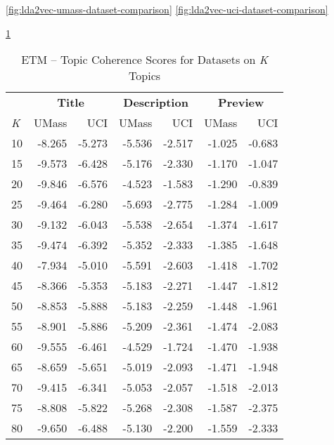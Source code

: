 \documentclass[letterpaper,12pt]{article}
\begin{document}
\ref{fig:lda2vec-umass-dataset-comparison}
\ref{fig:lda2vec-uci-dataset-comparison}

\ref{tab:etm_data_comp}
\begin{table}
	\caption{\label{tab:etm_data_comp} ETM -- Topic Coherence Scores for Datasets on \emph{K} Topics}
	\begin{center}
		\begin{tabular}{| l | rr | rr | rr |}
			\hline
			{} & \multicolumn{2}{c|}{\textbf{Title}} & \multicolumn{2}{c|}{\textbf{Description}} & \multicolumn{2}{c|}{\textbf{Preview}} \\
			\emph{K} &       UMass &    UCI &  UMass &    UCI &   UMass &    UCI \\
			\hline
			10  & -8.265 & -5.273 &      -5.536 & -2.517 &  -1.025 & -0.683 \\
			15  & -9.573 & -6.428 &      -5.176 & -2.330 &  -1.170 & -1.047 \\
			20  & -9.846 & -6.576 &      -4.523 & -1.583 &  -1.290 & -0.839 \\
			25  & -9.464 & -6.280 &      -5.693 & -2.775 &  -1.284 & -1.009 \\
			30  & -9.132 & -6.043 &      -5.538 & -2.654 &  -1.374 & -1.617 \\
			35  & -9.474 & -6.392 &      -5.352 & -2.333 &  -1.385 & -1.648 \\
			40  & -7.934 & -5.010 &      -5.591 & -2.603 &  -1.418 & -1.702 \\
			45  & -8.366 & -5.353 &      -5.183 & -2.271 &  -1.447 & -1.812 \\
			50  & -8.853 & -5.888 &      -5.183 & -2.259 &  -1.448 & -1.961 \\
			55  & -8.901 & -5.886 &      -5.209 & -2.361 &  -1.474 & -2.083 \\
			60  & -9.555 & -6.461 &      -4.529 & -1.724 &  -1.470 & -1.938 \\
			65  & -8.659 & -5.651 &      -5.019 & -2.093 &  -1.471 & -1.948 \\
			70  & -9.415 & -6.341 &      -5.053 & -2.057 &  -1.518 & -2.013 \\
			75  & -8.808 & -5.822 &      -5.268 & -2.308 &  -1.587 & -2.375 \\
			80  & -9.650 & -6.488 &      -5.130 & -2.200 &  -1.559 & -2.333 \\

\end{tabular}
\end{center}
\end{table}
\end{document}
